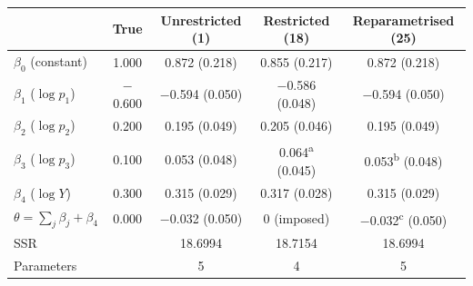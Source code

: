 \begin{tabular}{lcccc}
\toprule
 & True & Unrestricted (1) & Restricted (18) & Reparametrised (25) \\
\midrule
$\beta_0$ (constant) & 1.000 & 0.872 (0.218) & 0.855 (0.217) & 0.872 (0.218) \\
$\beta_1$ ($\log p_1$) & $-$0.600 & $-$0.594 (0.050) & $-$0.586 (0.048) & $-$0.594 (0.050) \\
$\beta_2$ ($\log p_2$) & 0.200 & 0.195 (0.049) & 0.205 (0.046) & 0.195 (0.049) \\
$\beta_3$ ($\log p_3$) & 0.100 & 0.053 (0.048) & 0.064\textsuperscript{a} (0.045) & 0.053\textsuperscript{b} (0.048) \\
$\beta_4$ ($\log Y$) & 0.300 & 0.315 (0.029) & 0.317 (0.028) & 0.315 (0.029) \\
$\theta=\sum_j\beta_j+\beta_4$ & 0.000 & $-$0.032 (0.050) & 0 (imposed) & $-$0.032\textsuperscript{c} (0.050) \\
\midrule
SSR & & 18.6994 & 18.7154 & 18.6994 \\
Parameters & & 5 & 4 & 5 \\
\bottomrule
\end{tabular}
